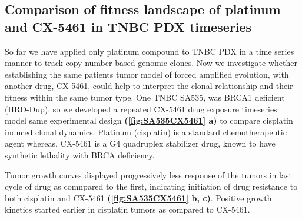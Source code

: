\subsection{Comparison of fitness landscape of platinum and CX-5461 in TNBC PDX timeseries}
So far we have applied only platinum compound to TNBC PDX in a time series manner to track copy number based genomic clones. Now we investigate whether establishing the same patients tumor model of forced amplified evolution, with another drug, CX-5461, could help to interpret the clonal relationship and their fitness within the same tumor type.
One TNBC SA535, was BRCA1 deficient (HRD-Dup), so we developed a repeated CX-5461 drug exposure timeseries model same experimental design \textbf{(\autoref{fig:SA535CX5461} a)} to compare cisplatin induced clonal dynamics. Platinum (cisplatin) is a standard chemotherapeutic agent whereas, CX-5461 is a G4 quadruplex stabilizer drug, known to have synthetic lethality with BRCA deficiency.


Tumor growth curves displayed progressively less response of the tumors in last cycle of drug as comnpared to the first, indicating initiation of drug resistance to both cisplatin and CX-5461 \textbf{(\autoref{fig:SA535CX5461} b, c)}. Positive growth kinetics started earlier in cisplatin tumors as compared to CX-5461.

